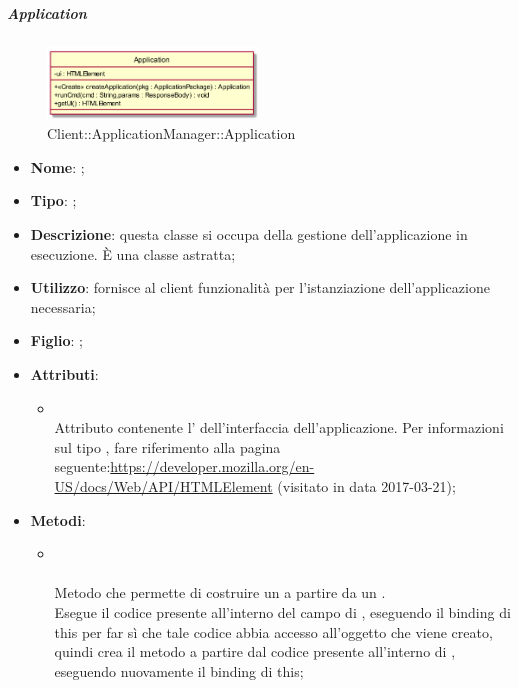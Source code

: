 \hypertarget{Application_label}{\subparagraph{Application}}
\begin{figure}[h]
	\centering
	\includegraphics[width=0.50\textwidth,height=\textheight,keepaspectratio]{images/ClassApplication.png}
	\caption{Client::ApplicationManager::Application}
\end{figure}
\begin{itemize}
	\item \textbf{Nome}: ;
	\item \textbf{Tipo}: ;
	\item \textbf{Descrizione}: questa classe si occupa della gestione dell'applicazione in esecuzione. È una classe astratta;
	\item \textbf{Utilizzo}: fornisce al client funzionalità per l'istanziazione dell'applicazione necessaria;
	\item \textbf{Figlio}: ;
	\item \textbf{Attributi}:
	\begin{itemize}
		\item[]  \\
		Attributo contenente l' dell'interfaccia dell'applicazione. Per informazioni sul tipo , fare riferimento alla pagina seguente:\url{https://developer.mozilla.org/en-US/docs/Web/API/HTMLElement}  (visitato in data 2017-03-21);
	\end{itemize}
	\item \textbf{Metodi}:
	\begin{itemize}
		\item[] \\ \\		Metodo che permette di costruire un  a partire da un . \\
Esegue il codice presente all'interno del campo  di , eseguendo il binding di this per far sì che tale codice abbia accesso all'oggetto che viene creato, quindi crea il metodo  a partire dal codice presente all'interno di , eseguendo nuovamente il binding di this;\\

\end{itemize}
\end{itemize}
